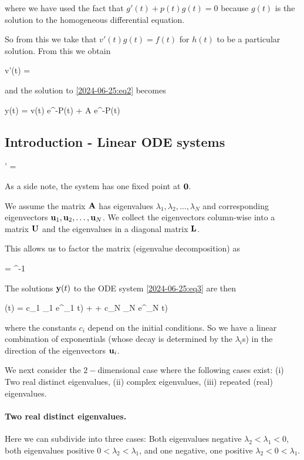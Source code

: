 where we have used the fact that $g'(t) + p(t) g(t) = 0$ because $g(t)$ is the solution to the homogeneous differential equation.

So from this we take that $v'(t) g(t) = f(t)$ for $h(t)$ to be a particular solution. From this we obtain

\bee
v'(t) = 
\eee

and the solution to \eqref{2024-06-25:eq2} becomes

\bee
y(t) = v(t) e^{-P(t)} + A e^{-P(t)}
\eee

\subsection{Introduction - Linear ODE systems}

\be\label{2024-06-25:eq3}
\ybf' = \Abf \ybf
\ee

As a side note, the system has one fixed point at $\mathbf{0}$.

We assume the matrix $\mathbf{A}$ has eigenvalues $\lambda_1, \lambda_2, \ldots, \lambda_N$ and corresponding eigenvectors $\mathbf{u}_1, \mathbf{u}_2, \ldots, \mathbf{u}_N$. We collect the eigenvectors column-wise into a matrix $\mathbf{U}$ and the eigenvalues in a diagonal matrix $\mathbf{L}$.

This allows us to factor the matrix (eigenvalue decomposition) as

\bee
\Abf = \Ubf \Lbf \Ubf^{-1}
\eee

The solutions $\mathbf{y}(t)$ to the ODE system \eqref{2024-06-25:eq3} are then 

\bee
\ybf(t) = c_1 \ubf_1 e^{\lambda_1 t)} + \cdots + c_N \ubf_N e^{\lambda_N t)}
\eee

where the constants $c_i$ depend on the initial conditions. So we have a linear combination of exponentials (whose decay is determined by the $\lambda_i$s) in the direction of the eigenvectors $\mathbf{u}_i$.

We next consider the $2-$dimensional case where the following cases exist: (i) Two real distinct eigenvalues, (ii) complex eigenvalues, (iii) repeated (real) eigenvalues.

\paragraph{Two real distinct eigenvalues.} Here we can subdivide into three cases: Both eigenvalues negative $\lambda_2 < \lambda_1 < 0$, both eigenvalues positive $0 < \lambda_2 < \lambda_1$, and one negative, one positive $\lambda_2 < 0 < \lambda_1$.

